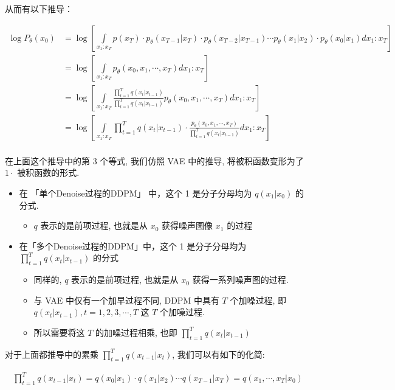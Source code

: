 从而有以下推导：

\begin{equation}
    \begin{aligned}
	\log P_\theta(x_0)&=\log\left[\int\limits_{x_1:x_T}p (x_T)\cdot p_\theta(x_{T-1}|x_T)\cdot p_\theta(x_{T-2}|x_{T-1})\cdots p_\theta(x_1|x_2)\cdot p_\theta (x_0|x_1)dx_1:x_T\right]\\
	&=\log\left[\int\limits_{x_{1}:x_T}p_\theta(x_0,x_1,\cdots,x_T)dx_1:x_T\right]\\
	&=\log\left[\int\limits_{x_1:x_T} \frac{\prod_{t=1}^T q(x_t|x_{t-1})}{\prod_{t=1}^T q(x_t|x_{t-1})} p_\theta(x_0,x_1,\cdots,x_T) dx_1:x_T\right]\\
	&=\log\left[\int\limits_{x_1:x_T} \prod_{t=1}^T q(x_t|x_{t-1})\cdot\frac{p_\theta(x_0,x_1,\cdots,x_T) }{\prod_{t=1}^T q(x_t|x_{t-1})}dx_1:x_T\right]\\
    \end{aligned}
\end{equation}


在上面这个推导中的第 3 个等式, 我们仿照 VAE 中的推导, 将被积函数变形为了 $1\cdot$ 被积函数的形式. 
\begin{itemize}
    \item 在 「单个Denoise过程的DDPM」 中，这个 1 是分子分母均为 $q (x_1|x_0)$ 的分式.
    \begin{itemize}
        \item $q$ 表示的是前项过程, 也就是从 $x_0$ 获得噪声图像 $x_1$ 的过程
    \end{itemize}
    \item 在「多个Denoise过程的DDPM」中，这个 1 是分子分母均为 $\prod_{t=1}^T q(x_t|x_{t-1})$ 的分式
    \begin{itemize}
        \item 同样的, $q$ 表示的是前项过程, 也就是从 $x_0$ 获得一系列噪声图的过程.
        \item 与 VAE 中仅有一个加早过程不同, DDPM 中具有 $T$ 个加噪过程, 即 $q(x_{t}|x_{t-1}), t=1,2,3,\cdots,T$ 这 $T$ 个加噪过程.
        \item 所以需要将这 $T$ 的加噪过程相乘, 也即 $\prod_{t=1}^T q(x_t|x_{t-1})$
    \end{itemize}
\end{itemize}

对于上面都推导中的累乘 $\prod_{t=1}^T q(x_{t-1}|x_t)$, 我们可以有如下的化简: 

\begin{equation}
\begin{aligned}
    \prod_{t=1}^T q(x_{t-1}|x_t)=q(x_0|x_1)\cdot q(x_1|x_2)\cdots q(x_{T-1}|x_T)=q(x_1,\cdots,x_T|x_0)
\end{aligned}
\end{equation}

